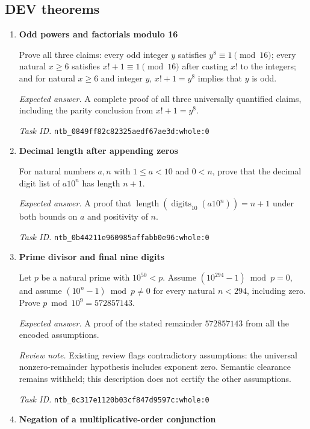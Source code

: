 \documentclass[11pt]{article}
\newcommand{\pth}[1]{\nolinkurl{#1}}
\begin{document}
\subsection{DEV theorems}
\begin{enumerate}[label={DEV \arabic*.},leftmargin=4.5em,itemsep=1em]
\item \textbf{Odd powers and factorials modulo 16}\label{qn:dev:1}

Prove all three claims: every odd integer $y$ satisfies $y^8\equiv1\pmod{16}$; every natural $x\ge6$ satisfies $x!+1\equiv1\pmod{16}$ after casting $x!$ to the integers; and for natural $x\ge6$ and integer $y$, $x!+1=y^8$ implies that $y$ is odd.

\emph{Expected answer.} A complete proof of all three universally quantified claims, including the parity conclusion from $x!+1=y^8$.

\emph{Task ID.} \pth{ntb_0849ff82c82325aedf67ae3d:whole:0}

\item \textbf{Decimal length after appending zeros}\label{qn:dev:2}

For natural numbers $a,n$ with $1\le a<10$ and $0<n$, prove that the decimal digit list of $a10^n$ has length $n+1$.

\emph{Expected answer.} A proof that $\operatorname{length}(\operatorname{digits}_{10}(a10^n))=n+1$ under both bounds on $a$ and positivity of $n$.

\emph{Task ID.} \pth{ntb_0b44211e960985affabb0e96:whole:0}

\item \textbf{Prime divisor and final nine digits}\label{qn:dev:3}

Let $p$ be a natural prime with $10^{50}<p$. Assume $(10^{294}-1)\bmod p=0$, and assume $(10^n-1)\bmod p\ne0$ for every natural $n<294$, including zero. Prove $p\bmod10^9=572857143$.

\emph{Expected answer.} A proof of the stated remainder $572857143$ from all the encoded assumptions.

\emph{Review note.} Existing review flags contradictory assumptions: the universal nonzero-remainder hypothesis includes exponent zero. Semantic clearance remains withheld; this description does not certify the other assumptions.

\emph{Task ID.} \pth{ntb_0c317e1120b03cf847d9597c:whole:0}

\item \textbf{Negation of a multiplicative-order conjunction}\label{qn:dev:4}


\end{enumerate}
\end{document}
